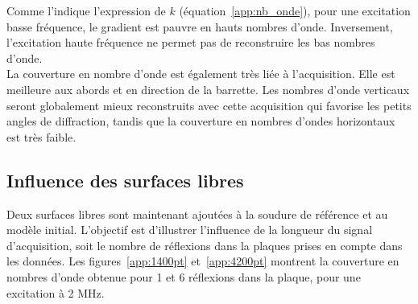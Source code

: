 Comme l'indique l'expression de $k$ (équation~\ref{app:nb_onde}), pour une excitation basse fréquence, le gradient est pauvre en hauts nombres d'onde. Inversement, l'excitation haute fréquence ne permet pas de reconstruire les bas nombres d'onde.\\
La couverture en nombre d'onde est également très liée à l'acquisition. Elle est meilleure aux abords et en direction de la barrette. Les nombres d'onde verticaux seront globalement mieux reconstruits avec cette acquisition qui favorise les petits angles de diffraction, tandis que la couverture en nombres d'ondes horizontaux est très faible.

\subsection{Influence des surfaces libres}

Deux surfaces libres sont maintenant ajoutées à la soudure de référence et au modèle initial. L'objectif est d'illustrer l'influence de la longueur du signal d'acquisition, soit le nombre de réflexions dans la plaques prises en compte dans les données. Les figures~\ref{app:1400pt} et~\ref{app:4200pt} montrent la couverture en nombres d'onde obtenue  pour 1 et 6 réflexions dans la plaque, pour une excitation à 2 MHz.

